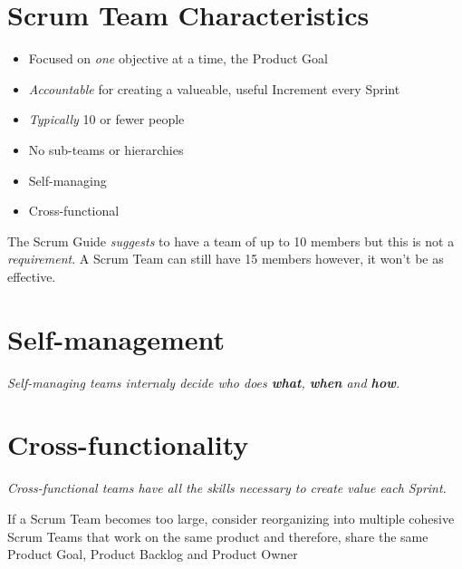 \documentclass[a4paper,11pt,twocolumn]{article}
\begin{document}
\section*{Scrum Team Characteristics}
\begin{itemize}
	\item Focused on \textit{one} objective at a time, the Product Goal
	\item \textit{Accountable} for creating a valueable, useful Increment every Sprint
	\item \textit{Typically} 10 or fewer people
	\item No sub-teams or hierarchies
	\item Self-managing
	\item Cross-functional
\end{itemize}

\begin{tcolorbox}[colback=black!8!white,colframe=gray!50!black,title=Note,sharp corners,fonttitle=\normalsize\bfseries,fontupper=\normalsize,left=0.7em,right=0.7em]
	The Scrum Guide \textit{suggests} to have a team of up to 10 members but this is not a \textit{requirement}. A Scrum Team can still have 15 members however, it won't be as effective.
\end{tcolorbox}

\section*{Self-management}
\textit{Self-managing teams internaly decide who does \textbf{what}, \textbf{when} and \textbf{how}.}

\section*{Cross-functionality}
\textit{Cross-functional teams have all the skills necessary to create value each Sprint.}

\hspace{0.5pt}

\begin{tcolorbox}[colback=black!8!white,colframe=gray!50!black,title=Note,sharp corners,fonttitle=\normalsize\bfseries,fontupper=\normalsize,left=0.7em,right=0.7em]
	If a Scrum Team becomes too large, consider reorganizing into multiple cohesive Scrum Teams that work on the same product and therefore, share the same Product Goal, Product Backlog and Product Owner
\end{tcolorbox}
\end{document}
